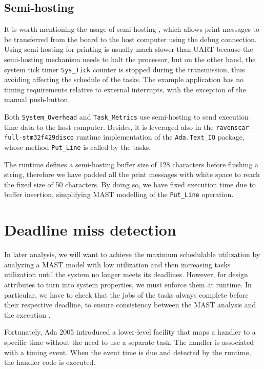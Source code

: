 \documentclass{article}
\begin{document}
\subsection{Semi-hosting}

It is worth mentioning the usage of semi-hosting \cite{semihosting}, which allows print messages to be transferred from the board to the host computer using the debug connection. Using semi-hosting for printing is usually much slower than UART because the semi-hosting mechanism needs to halt the processor, but on the other hand, the system tick timer \texttt{Sys\_Tick} counter is stopped during the transmission, thus avoiding affecting the schedule of the tasks. The example application has no timing requirements relative to external interrupts, with the exception of the manual push-button.

Both \texttt{System\_Overhead} and \texttt{Task\_Metrics} use semi-hosting to send execution time data to the host computer. Besides, it is leveraged also in the \texttt{ravenscar-full-stm32f429disco} runtime implementation of the \texttt{Ada.Text\_IO} package, whose method \texttt{Put\_Line} is called by the tasks.

The runtime defines a semi-hosting buffer size of 128 characters before flushing a string, therefore we have padded all the print messages with white space to reach the fixed size of 50 characters. By doing so, we have fixed execution time due to buffer insertion, simplifying MAST modelling of the \texttt{Put\_Line} operation.

\section{Deadline miss detection}

In later analysis, we will want to achieve the maximum schedulable utilization by analyzing a MAST model with low utilization and then increasing tasks utilization until the system no longer meets its deadlines. However, for design attributes to turn into system properties, we must enforce them at runtime. In particular, we have to check that the jobs of the tasks always complete before their respective deadline, to ensure consistency between the MAST analysis and the execution \cite{timing-properties}.

Fortunately, Ada 2005 introduced a lower-level facility that maps a handler to a specific time without the need to use a separate task. The handler is associated with a timing event. When the event time is due and detected by the runtime, the handler code is executed.
\end{document}
